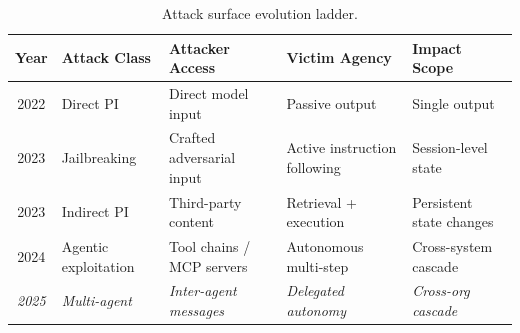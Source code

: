 
\begin{table}[htbp]
\centering
\caption{Attack surface evolution ladder.}
\label{tab:ladder}

\fontsize{7}{7}\selectfont
\setlength{\tabcolsep}{5pt}
\renewcommand{\arraystretch}{1.3}

\begin{tabularx}{\textwidth}{
  c
  >{\raggedright\arraybackslash}p{2.2cm}
  >{\raggedright\arraybackslash}X
  >{\raggedright\arraybackslash}X
  >{\raggedright\arraybackslash}X
}
\toprule
\textbf{Year} & \textbf{Attack Class} & \textbf{Attacker Access} & \textbf{Victim Agency} & \textbf{Impact Scope} \\
\midrule

\rowcolor{rowgray}
2022 & Direct PI
  & Direct model input
  & Passive output
  & Single output \\

\addlinespace[2pt]

2023 & Jailbreaking
  & Crafted adversarial input
  & Active instruction following
  & Session-level state \\

\addlinespace[2pt]

\rowcolor{rowgray}
2023 & Indirect PI
  & Third-party content
  & Retrieval + execution
  & Persistent state changes \\

\addlinespace[2pt]

2024 & Agentic exploitation
  & Tool chains / MCP servers
  & Autonomous multi-step
  & Cross-system cascade \\

\addlinespace[2pt]

\rowcolor{rowgray}
\emph{2025} & \emph{Multi-agent}
  & \emph{Inter-agent messages}
  & \emph{Delegated autonomy}
  & \emph{Cross-org cascade} \\

\bottomrule
\end{tabularx}
\end{table}
